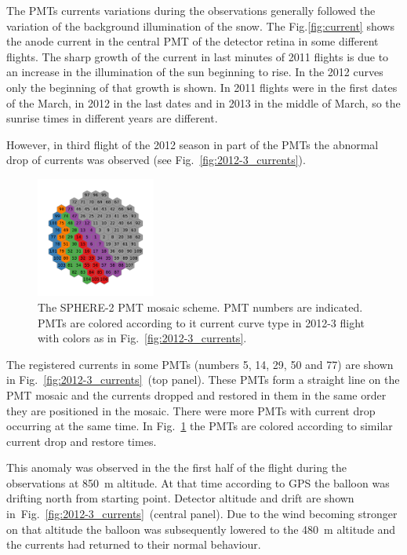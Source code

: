 \documentclass[final,5p,times,twocolumn]{elsarticle}
\begin{document}
The PMTs currents variations during the observations generally followed the variation of the background illumination of the snow. The Fig.\ref{fig:current} shows the anode current in the central PMT of the detector retina in some different flights. The sharp growth of the current in last minutes of 2011 flights is due to an increase in the illumination of the sun beginning to rise. In the 2012 curves only the beginning of that growth is shown. In 2011 flights were in the first dates of the March, in 2012 in the last dates and in 2013 in the middle of March, so the sunrise times in different years are different. 

However, in third flight of the 2012 season in part of the PMTs the abnormal drop of currents was observed (see Fig.~\ref{fig:2012-3_currents}).

\begin{figure}[tb]
\centering
    \includegraphics[width=0.35\textwidth]{2012-3_retina_all.pdf}
    \caption{The SPHERE-2 PMT mosaic scheme. PMT numbers are indicated. PMTs are colored according to it current curve type in 2012-3 flight with colors as in Fig.~\ref{fig:2012-3_currents}.}
    \label{fig:2012-3_shore_image}
\end{figure}

The registered currents in some PMTs (numbers 5, 14, 29, 50 and 77) are shown in Fig.~\ref{fig:2012-3_currents}~(top panel). These PMTs form a straight line on the PMT mosaic and the currents dropped and restored in them in the same order they are positioned in the mosaic. There were more PMTs with current drop occurring at the same time. In Fig.~\ref{fig:2012-3_shore_image} the PMTs are colored according to similar current drop and restore times.

This anomaly was observed in the the first half of the flight during the observations at 850~m altitude. At that time according to GPS the balloon was drifting north from starting point. Detector altitude and drift are shown in~Fig.~\ref{fig:2012-3_currents}~(central panel). Due to the wind becoming stronger on that altitude the balloon was subsequently lowered to the 480~m altitude and the currents had returned to their normal behaviour. 
\end{document}
